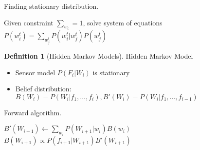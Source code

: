 \documentclass[11pt]{article}
\theoremstyle{definition}
\newtheorem{definition}{Definition}[section]
\theoremstyle{remark}
\begin{document}
\begin{algorithm}
    \caption{Finding stationary distribution.}

    
    \DontPrintSemicolon
	    
    Given constraint $\sum_{w_t} = 1$, solve system of equations $P(w_i^t) = \sum_{w_j^t} P(w_i^t | w_j^t) P(w_j^t)$ 
\end{algorithm}

\begin{definition}[Hidden Markov Models]
Hidden Markov Model
\begin{itemize}
\item Sensor model $P(F_i | W_i)$ is stationary
\item Belief distribution: $B(W_i) = P(W_i | f_1, \dots, f_i), B'(W_i) = P(W_i | f_1, \dots, f_{i-1})$
\end{itemize}
\end{definition}

\begin{algorithm}
    \caption{Forward algorithm.}

    
    \DontPrintSemicolon
    
    $B'(W_{i+1}) \gets \sum_{w_i} P(W_{i+1} | w_i)B(w_i)$ 
    $B(W_{i+1}) \propto P(f_{i+1} | W_{i+1}) B'(W_{i+1})$ 
    
\end{algorithm}
\end{document}
